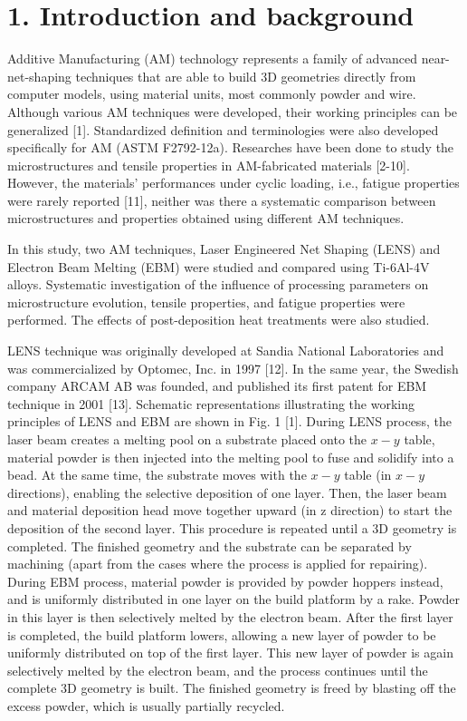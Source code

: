 \documentclass[10pt]{article}
\begin{document}
\section*{1. Introduction and background}
Additive Manufacturing (AM) technology represents a family of advanced near-net-shaping techniques that are able to build 3D geometries directly from computer models, using material units, most commonly powder and wire. Although various AM techniques were developed, their working principles can be generalized [1]. Standardized definition and terminologies were also developed specifically for AM (ASTM F2792-12a). Researches have been done to study the microstructures and tensile properties in AM-fabricated materials [2-10]. However, the materials' performances under cyclic loading, i.e., fatigue properties were rarely reported [11], neither was there a systematic comparison between microstructures and properties obtained using different AM techniques.

In this study, two AM techniques, Laser Engineered Net Shaping (LENS) and Electron Beam Melting (EBM) were studied and compared using Ti-6Al-4V alloys. Systematic investigation of the influence of processing parameters on microstructure evolution, tensile properties, and fatigue properties were performed. The effects of post-deposition heat treatments were also studied.

LENS technique was originally developed at Sandia National Laboratories and was commercialized by Optomec, Inc. in 1997 [12]. In the same year, the Swedish company ARCAM AB was founded, and published its first patent for EBM technique in 2001 [13]. Schematic representations illustrating the working principles of LENS and EBM are shown in Fig. 1 [1]. During LENS process, the laser beam creates a melting pool on a substrate placed onto the $x-y$ table, material powder is then injected into the melting pool to fuse and solidify into a bead. At the same time, the substrate moves with the $x-y$ table (in $x-y$ directions), enabling the selective deposition of one layer. Then, the laser beam and material deposition head move together upward (in $\mathrm{z}$ direction) to start the deposition of the second layer. This procedure is repeated until a 3D geometry is completed. The finished geometry and the substrate can be separated by machining (apart from the cases where the process is applied for repairing). During EBM process, material powder is provided by powder hoppers instead, and is uniformly distributed in one layer on the build platform by a rake. Powder in this layer is then selectively melted by the electron beam. After the first layer is completed, the build platform lowers, allowing a new layer of powder to be uniformly distributed on top of the first layer. This new layer of powder is again selectively melted by the electron beam, and the process continues until the complete 3D geometry is built. The finished geometry is freed by blasting off the excess powder, which is usually partially recycled.
\end{document}
